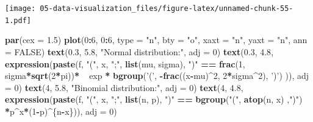 \documentclass[
  11pt,
]{krantz}
\newenvironment{Shaded}{\begin{snugshade}}{\end{snugshade}}
\newcommand{\DataTypeTok}[1]{\textcolor[rgb]{0.27,0.27,0.27}{#1}}
\newcommand{\DecValTok}[1]{\textcolor[rgb]{0.06,0.06,0.06}{#1}}
\newcommand{\ErrorTok}[1]{\textcolor[rgb]{0.14,0.14,0.14}{\textbf{#1}}}
\newcommand{\FloatTok}[1]{\textcolor[rgb]{0.06,0.06,0.06}{#1}}
\newcommand{\KeywordTok}[1]{\textcolor[rgb]{0.27,0.27,0.27}{\textbf{#1}}}
\newcommand{\NormalTok}[1]{#1}
\newcommand{\OperatorTok}[1]{\textcolor[rgb]{0.43,0.43,0.43}{\textbf{#1}}}
\newcommand{\OtherTok}[1]{\textcolor[rgb]{0.37,0.37,0.37}{#1}}
\newcommand{\StringTok}[1]{\textcolor[rgb]{0.5,0.5,0.5}{#1}}
\begin{document}
\texttt{[image: 05-data-visualization\_files/figure-latex/unnamed-chunk-55-1.pdf]}

\normalsize

\begin{tiny}

\footnotesize

\begin{Shaded}
\begin{Highlighting}[]
\KeywordTok{par}\NormalTok{(}\DataTypeTok{cex =} \FloatTok{1.5}\NormalTok{)}
\KeywordTok{plot}\NormalTok{(}\DecValTok{0}\OperatorTok{:}\DecValTok{6}\NormalTok{, }\DecValTok{0}\OperatorTok{:}\DecValTok{6}\NormalTok{,}
     \DataTypeTok{type =} \StringTok{"n"}\NormalTok{,}
     \DataTypeTok{bty =} \StringTok{"o"}\NormalTok{,}
     \DataTypeTok{xaxt =} \StringTok{"n"}\NormalTok{,}
     \DataTypeTok{yaxt =} \StringTok{"n"}\NormalTok{,}
     \DataTypeTok{ann =} \OtherTok{FALSE}\NormalTok{)}
\KeywordTok{text}\NormalTok{(}\FloatTok{0.3}\NormalTok{, }\FloatTok{5.8}\NormalTok{, }\StringTok{"Normal distribution:"}\NormalTok{, }\DataTypeTok{adj =} \DecValTok{0}\NormalTok{)}
\KeywordTok{text}\NormalTok{(}\FloatTok{0.3}\NormalTok{, }\FloatTok{4.8}\NormalTok{, }\KeywordTok{expression}\NormalTok{(}\KeywordTok{paste}\NormalTok{(f, }\StringTok{"("}\NormalTok{, x, }\StringTok{";"}\NormalTok{, }\KeywordTok{list}\NormalTok{(mu, sigma), }\StringTok{")"}
                                \OperatorTok{==}\StringTok{ }\KeywordTok{frac}\NormalTok{(}\DecValTok{1}\NormalTok{, sigma}\OperatorTok{*}\KeywordTok{sqrt}\NormalTok{(}\DecValTok{2}\OperatorTok{*}\NormalTok{pi))}\OperatorTok{*}\ErrorTok{~~}\NormalTok{exp }\OperatorTok{*}
\StringTok{                                  }\KeywordTok{bgroup}\NormalTok{(}\StringTok{'('}\NormalTok{, }\OperatorTok{-}\KeywordTok{frac}\NormalTok{((x}\OperatorTok{-}\NormalTok{mu)}\OperatorTok{^}\DecValTok{2}\NormalTok{, }
                                                    \DecValTok{2}\OperatorTok{*}\NormalTok{sigma}\OperatorTok{^}\DecValTok{2}\NormalTok{), }\StringTok{')'}\NormalTok{) }
\NormalTok{                                )),}
     \DataTypeTok{adj =} \DecValTok{0}\NormalTok{)}
\KeywordTok{text}\NormalTok{(}\DecValTok{4}\NormalTok{, }\FloatTok{5.8}\NormalTok{, }\StringTok{"Binomial distribution:"}\NormalTok{, }\DataTypeTok{adj =} \DecValTok{0}\NormalTok{)}
\KeywordTok{text}\NormalTok{(}\DecValTok{4}\NormalTok{, }\FloatTok{4.8}\NormalTok{, }\KeywordTok{expression}\NormalTok{(}\KeywordTok{paste}\NormalTok{(f, }\StringTok{"("}\NormalTok{, x, }\StringTok{";"}\NormalTok{, }\KeywordTok{list}\NormalTok{(n, p), }\StringTok{")"}
                                \OperatorTok{==}\StringTok{ }\KeywordTok{bgroup}\NormalTok{(}\StringTok{"("}\NormalTok{, }\KeywordTok{atop}\NormalTok{(n, x) ,}\StringTok{")"}\NormalTok{)}
                              \OperatorTok{*}\NormalTok{p}\OperatorTok{^}\NormalTok{x}\OperatorTok{*}\NormalTok{(}\DecValTok{1}\OperatorTok{-}\NormalTok{p)}\OperatorTok{^}\NormalTok{\{n}\OperatorTok{-}\NormalTok{x\})),}
     \DataTypeTok{adj =} \DecValTok{0}\NormalTok{)}


\end{Highlighting}
\end{Shaded}
\end{tiny}
\end{document}
